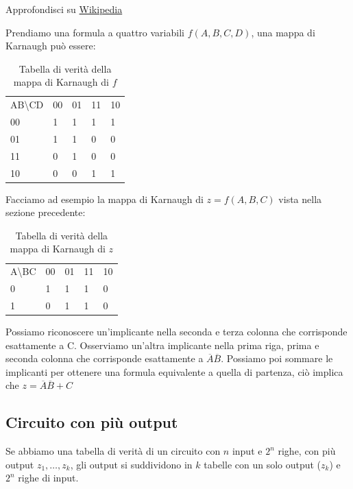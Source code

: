 Approfondisci su \href{https://en.wikipedia.org/wiki/Karnaugh_map}{Wikipedia}

Prendiamo una formula a quattro variabili $ f(A,B,C,D) $, una mappa di Karnaugh può essere:
\begin{table}[H]
	\centering
	\caption{Tabella di verità della mappa di Karnaugh di $f$}
	\label{tab:karnaugh}
	\begin{tabular}{lllll}
		AB\textbackslash{}CD    & 00                     & 01                     & 11                     & 10                     \\ \cline{2-5} 
		\multicolumn{1}{l|}{00} & \multicolumn{1}{l|}{1} & \multicolumn{1}{l|}{1} & \multicolumn{1}{l|}{1} & \multicolumn{1}{l|}{1} \\ \cline{2-5} 
		\multicolumn{1}{l|}{01} & \multicolumn{1}{l|}{1} & \multicolumn{1}{l|}{1} & \multicolumn{1}{l|}{0} & \multicolumn{1}{l|}{0} \\ \cline{2-5} 
		\multicolumn{1}{l|}{11} & \multicolumn{1}{l|}{0} & \multicolumn{1}{l|}{1} & \multicolumn{1}{l|}{0} & \multicolumn{1}{l|}{0} \\ \cline{2-5} 
		\multicolumn{1}{l|}{10} & \multicolumn{1}{l|}{0} & \multicolumn{1}{l|}{0} & \multicolumn{1}{l|}{1} & \multicolumn{1}{l|}{1} \\ \cline{2-5} 
	\end{tabular}
\end{table}

Facciamo ad esempio la mappa di Karnaugh di $ z = f(A,B,C) $ vista nella sezione precedente:

\begin{table}[H]
	\centering
	\caption{Tabella di verità della mappa di Karnaugh di $z$}
	\label{tab:karnaugh}
	\begin{tabular}{lllll}
		A\textbackslash{}BC    & 00                     & 01                     & 11                     & 10                     \\ \cline{2-5} 
		\multicolumn{1}{l|}{0} & \multicolumn{1}{l|}{1} & \multicolumn{1}{l|}{1} & \multicolumn{1}{l|}{1} & \multicolumn{1}{l|}{0} \\ \cline{2-5} 
		\multicolumn{1}{l|}{1} & \multicolumn{1}{l|}{0} & \multicolumn{1}{l|}{1} & \multicolumn{1}{l|}{1} & \multicolumn{1}{l|}{0} \\ \cline{2-5} 
	\end{tabular}
\end{table}

Possiamo riconoscere un'implicante nella seconda e terza colonna che corrisponde esattamente a C. Osserviamo un'altra implicante nella prima riga, prima e seconda colonna che corrisponde esattamente a $ \overbar{A}\overbar{B} $. Possiamo poi sommare le implicanti per ottenere una formula equivalente a quella di partenza, ciò implica che $ z =  \overbar{A}\overbar{B} + C $


\subsection{Circuito con più output}
Se abbiamo una tabella di verità di un circuito con $ n $ input e $ 2^n $ righe, con più output $ z_1, \dots, z_k $, gli output si suddividono in $ k $ tabelle con un solo output ($ z_k $) e $ 2^n $ righe di input.